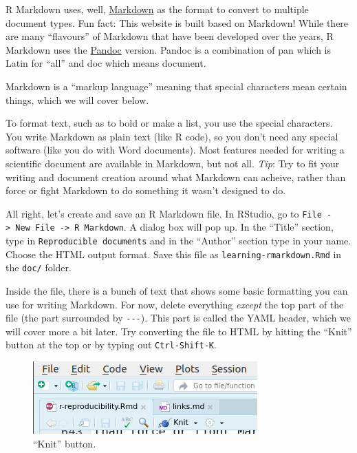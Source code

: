 \documentclass[]{Nemilov}
\begin{document}
R Markdown uses, well, \href{https://en.wikipedia.org/wiki/Markdown}{Markdown} as the format to convert to multiple
document types. Fun fact: This website is built based on Markdown! While there
are many ``flavours'' of Markdown that have been developed over the years, R
Markdown uses the \href{https://pandoc.org/MANUAL.html\#pandocs-markdown}{Pandoc} version. Pandoc is a combination of
pan which is Latin for ``all'' and doc which means document.

Markdown is a ``markup language'' meaning that special characters mean certain
things, which we will cover below.

To format text, such as to bold or make a list, you use the special characters.
You write Markdown as plain text (like R code), so you don't need any special
software (like you do with Word documents). Most features needed for writing a
scientific document are available in Markdown, but not all. \emph{Tip}: Try to fit
your writing and document creation around what Markdown can acheive, rather
than force or fight Markdown to do something it wasn't designed to do.

All right, let's create and save an R Markdown file. In RStudio, go to \texttt{File\ -\textgreater{}\ New\ File\ -\textgreater{}\ R\ Markdown}. A dialog box will pop up. In the ``Title'' section,
type in \texttt{Reproducible\ documents} and in the ``Author'' section type in your name.
Choose the HTML output format. Save this file as \texttt{learning-rmarkdown.Rmd} in the
\texttt{doc/} folder.

Inside the file, there is a bunch of text that shows some basic formatting you
can use for writing Markdown. For now, delete everything \emph{except} the top part
of the file (the part surrounded by \texttt{-\/-\/-}). This part is called the YAML header,
which we will cover more a bit later. Try converting the file to HTML by hitting
the ``Knit'' button at the top or by typing out \texttt{Ctrl-Shift-K}.

\begin{figure}
\centering
\includegraphics{figures/r-reproducibility/knit-button-rstudio.png}
\caption{``Knit'' button.}
\end{figure}
\end{document}
